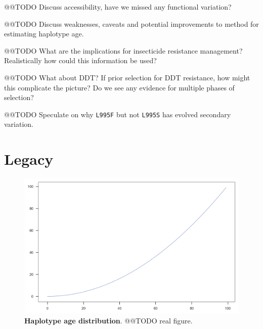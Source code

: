 \documentclass[a4paper,11pt,abstracton]{scrartcl}
\begin{document}
@@TODO Discuss accessibility, have we missed any functional variation?


@@TODO Discuss weaknesses, caveats and potential improvements to method for estimating haplotype age.


@@TODO What are the implications for insecticide resistance management? Realistically how could this information be used?


@@TODO What about DDT? If prior selection for DDT resistance, how might this complicate the picture? Do we see any evidence for multiple phases of selection?


@@TODO Speculate on why \texttt{L995F} but not \texttt{L995S} has evolved secondary variation.



\section*{Legacy}



%
\begin{figure}[!b]
  \includegraphics[width=1.1\linewidth,center]{artwork/demo.png}
  \caption{\textbf{Haplotype age distribution}. @@TODO real figure.}
  \label{fig:age_hist}
\end{figure}
\end{document}
